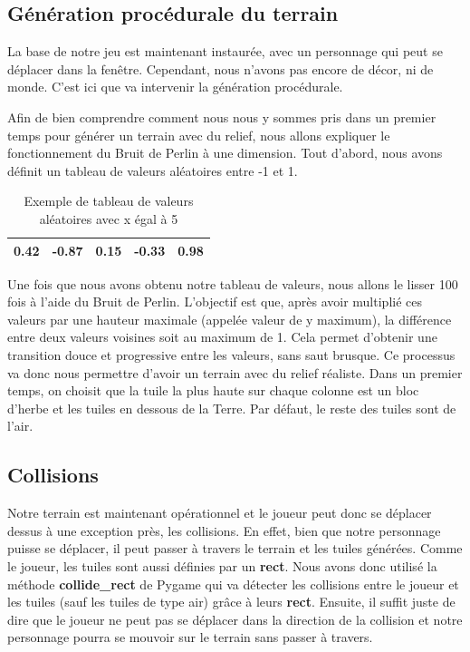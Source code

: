 \documentclass{article}
\begin{document}
\subsection{Génération procédurale du terrain}
La base de notre jeu est maintenant instaurée, avec un personnage qui peut se déplacer dans la fenêtre. Cependant, nous n'avons pas encore de décor, ni de monde. C'est ici que va intervenir la génération procédurale.\par
Afin de bien comprendre comment nous nous y sommes pris dans un premier temps pour générer un terrain avec du relief, nous allons expliquer le fonctionnement du Bruit de Perlin à une dimension. Tout d'abord, nous avons définit un tableau de valeurs aléatoires entre -1 et 1.\par
\begin{table}[h]
  \centering
  \begin{tabular}{|c|c|c|c|c|}
  \hline
  0.42 & -0.87 & 0.15 & -0.33 & 0.98\\
  \hline
  \end{tabular}
  \caption{Exemple de tableau de valeurs aléatoires avec x égal à 5}
  \label{tableau_aleatoire}
  \end{table}
  Une fois que nous avons obtenu notre tableau de valeurs, nous allons le lisser 100 fois à l’aide du Bruit de Perlin. L’objectif est que, après avoir multiplié ces valeurs par une hauteur maximale (appelée valeur de y maximum), la différence entre deux valeurs voisines soit au maximum de 1. Cela permet d’obtenir une transition douce et progressive entre les valeurs, sans saut brusque. Ce processus va donc nous permettre d'avoir un terrain avec du relief réaliste. Dans un premier temps, on choisit que la tuile la plus haute sur chaque colonne est un bloc d'herbe et les tuiles en dessous de la Terre. Par défaut, le reste des tuiles sont de l'air.\par
\subsection{Collisions}
  Notre terrain est maintenant opérationnel et le joueur peut donc se déplacer dessus à une exception près, les collisions. En effet, bien que notre personnage puisse se déplacer, il peut passer à travers le terrain et les tuiles générées. Comme le joueur, les tuiles sont aussi définies par un \textbf{rect}. Nous avons donc utilisé la méthode \textbf{collide\_rect} de Pygame qui va détecter les collisions entre le joueur et les tuiles (sauf les tuiles de type air) grâce à leurs \textbf{rect}. Ensuite, il suffit juste de dire que le joueur ne peut pas se déplacer dans la direction de la collision et notre personnage pourra se mouvoir sur le terrain sans passer à travers. \par
\end{document}
